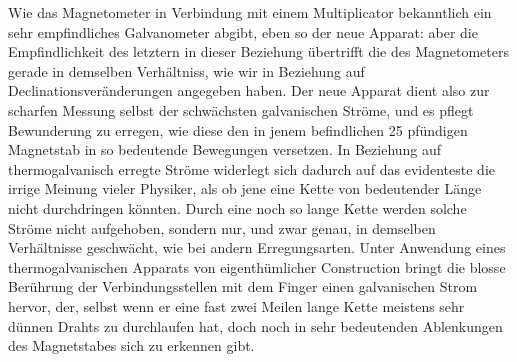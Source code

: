 Wie das Magnetometer in Verbindung mit einem Multiplicator bekanntlich ein sehr empfindliches Galvanometer abgibt, eben so der neue Apparat: aber die Empfindlichkeit des letztern in dieser Beziehung übertrifft die des Magnetometers gerade in demselben Verhältniss, wie wir in Beziehung auf Declinationsveränderungen angegeben haben. Der neue Apparat dient also zur scharfen Messung selbst der schwächsten galvanischen Ströme, und es pflegt Bewunderung zu erregen, wie diese den in jenem befindlichen 25 pfündigen Magnetstab in so bedeutende Bewegungen versetzen. In Beziehung auf thermogalvanisch erregte Ströme widerlegt sich dadurch auf das evidenteste die irrige Meinung vieler Physiker, als ob jene eine Kette von bedeutender Länge nicht durchdringen könnten. Durch eine noch so lange Kette werden solche Ströme nicht aufgehoben, sondern nur, und zwar genau, in demselben Verhältnisse geschwächt, wie bei andern Erregungsarten. Unter Anwendung eines thermogalvanischen Apparats von eigenthümlicher Construction bringt die blosse Berührung der Verbindungsstellen mit dem Finger einen galvanischen Strom hervor, der, selbst wenn er eine fast zwei Meilen lange Kette meistens sehr dünnen Drahts zu durchlaufen hat, doch noch in sehr bedeutenden Ablenkungen des Magnetstabes sich zu erkennen gibt.

